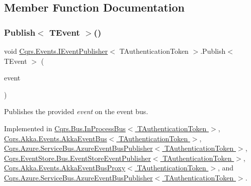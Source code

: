 \subsection{Member Function Documentation}
\mbox{\label{interfaceCqrs_1_1Events_1_1IEventPublisher_a02f0db0bc9b3aa1c7f766f58f8422ee3_a02f0db0bc9b3aa1c7f766f58f8422ee3}} 
\subsubsection{\texorpdfstring{Publish$<$ T\+Event $>$()}{Publish< TEvent >()}\hspace{0.1cm}{\footnotesize\ttfamily [1/2]}}
{\footnotesize\ttfamily void \hyperlink{interfaceCqrs_1_1Events_1_1IEventPublisher}{Cqrs.\+Events.\+I\+Event\+Publisher}$<$ T\+Authentication\+Token $>$.Publish$<$ T\+Event $>$ (\begin{DoxyParamCaption}\item[{T\+Event @}]{event }\end{DoxyParamCaption})}



Publishes the provided {\itshape event}  on the event bus. 



Implemented in \hyperlink{classCqrs_1_1Bus_1_1InProcessBus_afd3d41a5f27a985e9d6ccf3f6f77f11a_afd3d41a5f27a985e9d6ccf3f6f77f11a}{Cqrs.\+Bus.\+In\+Process\+Bus$<$ T\+Authentication\+Token $>$}, \hyperlink{classCqrs_1_1Akka_1_1Events_1_1AkkaEventBus_aaba5d37020e21d03cc2bbc3da14f45ea_aaba5d37020e21d03cc2bbc3da14f45ea}{Cqrs.\+Akka.\+Events.\+Akka\+Event\+Bus$<$ T\+Authentication\+Token $>$}, \hyperlink{classCqrs_1_1Azure_1_1ServiceBus_1_1AzureEventBusPublisher_a175365f8217cfe163ffadc891f0cd3e3_a175365f8217cfe163ffadc891f0cd3e3}{Cqrs.\+Azure.\+Service\+Bus.\+Azure\+Event\+Bus\+Publisher$<$ T\+Authentication\+Token $>$}, \hyperlink{classCqrs_1_1EventStore_1_1Bus_1_1EventStoreEventPublisher_a1ebb6f08648bdfd5c5bd29fcc12adfea_a1ebb6f08648bdfd5c5bd29fcc12adfea}{Cqrs.\+Event\+Store.\+Bus.\+Event\+Store\+Event\+Publisher$<$ T\+Authentication\+Token $>$}, \hyperlink{classCqrs_1_1Akka_1_1Events_1_1AkkaEventBusProxy_a656daead2fe6f30487855dbaea5a3c83_a656daead2fe6f30487855dbaea5a3c83}{Cqrs.\+Akka.\+Events.\+Akka\+Event\+Bus\+Proxy$<$ T\+Authentication\+Token $>$}, and \hyperlink{classCqrs_1_1Azure_1_1ServiceBus_1_1AzureEventBusPublisher_a175365f8217cfe163ffadc891f0cd3e3_a175365f8217cfe163ffadc891f0cd3e3}{Cqrs.\+Azure.\+Service\+Bus.\+Azure\+Event\+Bus\+Publisher$<$ T\+Authentication\+Token $>$}.

